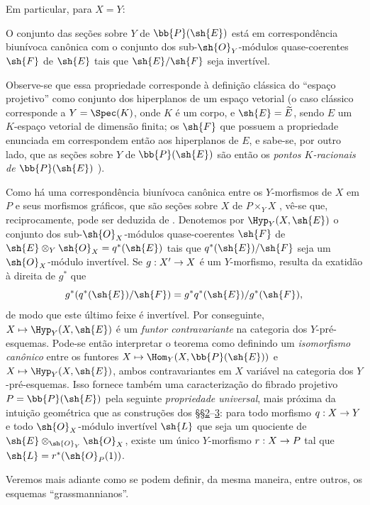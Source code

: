 \documentclass[oneside,10pt]{amsart}
\makeatletter
\newcommand{\ega@arrow}[2]{\mathchoice{#1}{#2}{#2}{#2}}
\let\ega@shortmapsto\mapsto
\renewcommand{\to}{\ega@arrow{\longrightarrow}{\rightarrow}}
\renewcommand{\mapsto}{\ega@arrow{\longmapsto}{\ega@shortmapsto}}
\let\EGAOriginalLabel\label
\renewcommand{\label}[1]{\phantomsection\EGAOriginalLabel{#1}}
\makeatother
\begin{document}
Em particular, para $X=Y$:
\begin{theorem}[4.2.4]
\label{II.4.2.4}
O conjunto das seções sobre $Y$ de $\bb{P}(\sh{E})$ está em correspondência biunívoca canônica com o conjunto dos sub-$\sh{O}_Y$-módulos quase-coerentes $\sh{F}$ de $\sh{E}$ tais que $\sh{E}/\sh{F}$ seja invertível.
\end{theorem}

Observe-se que essa propriedade corresponde à definição clássica do ``espaço projetivo'' como conjunto dos hiperplanos de um espaço vetorial (o caso clássico corresponde a $Y=\Spec(K)$, onde $K$ é um corpo, e $\sh{E}=\widetilde{E}$, sendo $E$ um $K$-espaço vetorial de dimensão finita; os $\sh{F}$ que possuem a propriedade enunciada em  correspondem então aos hiperplanos de $E$, e sabe-se, por outro lado, que as seções sobre $Y$ de $\bb{P}(\sh{E})$ são então os \emph{pontos $K$-racionais de $\bb{P}(\sh{E})$} ).

\begin{remark}[4.2.5]
\label{II.4.2.5}
Como há uma correspondência biunívoca canônica entre os $Y$-morfismos de $X$ em $P$ e seus morfismos gráficos, que são seções sobre $X$ de $P\times_Y X$ , vê-se que, reciprocamente,  pode ser deduzida de .
Denotemos por $\Hyp_Y(X,\sh{E})$ o conjunto dos sub-$\sh{O}_X$-módulos quase-coerentes $\sh{F}$ de $\sh{E}\otimes_Y\sh{O}_X=q^*(\sh{E})$ tais que $q^*(\sh{E})/\sh{F}$ seja um $\sh{O}_X$-módulo invertível.
Se $g:X'\to X$ é um $Y$-morfismo, resulta da exatidão à direita de $g^*$ que
\[
  g^*(q^*(\sh{E})/\sh{F})=g^*q^*(\sh{E})/g^*(\sh{F}),
\]
de modo que este último feixe é invertível. Por conseguinte, $X\mapsto\Hyp_Y(X,\sh{E})$ é um \emph{funtor contravariante} na categoria dos $Y$-pré-esquemas.
Pode-se então interpretar o teorema  como definindo um \emph{isomorfismo canônico} entre os funtores $X\mapsto\Hom_Y(X,\bb{P}(\sh{E}))$ e $X\mapsto\Hyp_Y(X,\sh{E})$, ambos contravariantes em $X$ variável na categoria dos $Y$-pré-esquemas.
Isso fornece também uma caracterização do fibrado projetivo $P=\bb{P}(\sh{E})$ pela seguinte \emph{propriedade universal}, mais próxima da intuição geométrica que as construções dos §§\hyperref[section:II.2]{2}--\hyperref[section:II.3]{3}:
para todo morfismo $q:X\to Y$ e todo $\sh{O}_X$-módulo invertível $\sh{L}$ que seja um quociente de $\sh{E}\otimes_{\sh{O}_Y}\sh{O}_X$, existe um único $Y$-morfismo $r:X\to P$ tal que $\sh{L}=r^*(\sh{O}_P(1))$.

Veremos mais adiante como se podem definir, da mesma maneira, entre outros, os esquemas ``grassmannianos''.
\end{remark}
\end{document}

